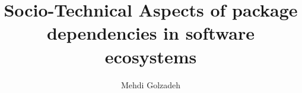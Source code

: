 



\renewcommand\footnotetextcopyrightpermission[1]{} %
\pagestyle{plain}

\usepackage{amssymb}%
\usepackage{pifont}%

\newcommand{\commentty}[1]{{\color{blue} \sf (TY: #1)}}
\newcommand{\commentlh}[1]{{\color{red} \sf (LH: #1)}}

\def\BibTeX{{\rm B\kern-.05em{\sc i\kern-.025em b}\kern-.08em
		T\kern-.1667em\lower.7ex\hbox{E}\kern-.125emX}}




	

	\title{Socio-Technical Aspects of package dependencies in software ecosystems}

	\author{Mehdi Golzadeh}
	
	\newcommand*{\Scale}[2][4]{\scalebox{#1}{$#2$}}%
	\newcommand{\Tool}{ComAir\xspace}
	\newcommand{\ComBugs}{30\xspace}
	
	
	
	
	
	
\maketitle
	






\newpage







